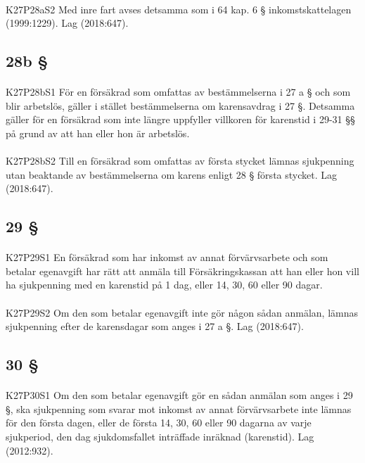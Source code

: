 \documentclass[a4paper,notitlepage,openany,10pt]{book}
\begin{document}
\paragraph*{}
{\tiny K27P28aS2}
Med inre fart avses detsamma som i 64 kap. 6 § inkomstskattelagen (1999:1229).
Lag (2018:647).
\subsection*{28b §}
\paragraph*{}
{\tiny K27P28bS1}
För en försäkrad som omfattas av bestämmelserna i 27 a § och som blir arbetslös, gäller i stället bestämmelserna om karensavdrag i 27 §. Detsamma gäller för en försäkrad som inte längre uppfyller villkoren för karenstid i 29-31 §§ på grund av att han eller hon är arbetslös.
\paragraph*{}
{\tiny K27P28bS2}
Till en försäkrad som omfattas av första stycket lämnas sjukpenning utan beaktande av bestämmelserna om karens enligt 28 § första stycket.
Lag (2018:647).
\subsection*{29 §}
\paragraph*{}
{\tiny K27P29S1}
En försäkrad som har inkomst av annat förvärvsarbete och som betalar egenavgift har rätt att anmäla till Försäkringskassan att han eller hon vill ha sjukpenning med en karenstid på 1 dag, eller 14, 30, 60 eller 90 dagar.
\paragraph*{}
{\tiny K27P29S2}
Om den som betalar egenavgift inte gör någon sådan anmälan, lämnas sjukpenning efter de karensdagar som anges i 27 a §.
Lag (2018:647).
\subsection*{30 §}
\paragraph*{}
{\tiny K27P30S1}
Om den som betalar egenavgift gör en sådan anmälan som anges i 29 §, ska sjukpenning som svarar mot inkomst av annat förvärvsarbete inte lämnas för den första dagen, eller de första 14, 30, 60 eller 90 dagarna av varje sjukperiod, den dag sjukdomsfallet inträffade inräknad (karenstid).
Lag (2012:932).
\end{document}
